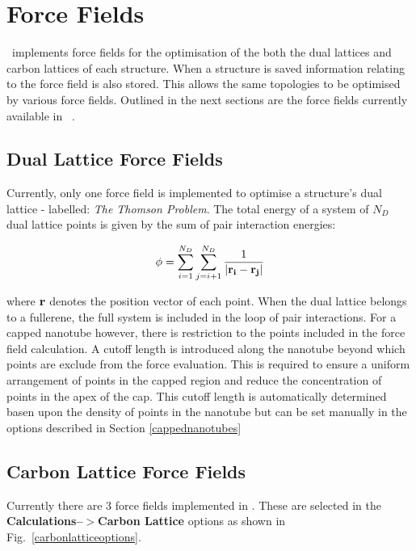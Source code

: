 \section{Force Fields}\label{forcefields}

\nanocap~implements force fields for the optimisation of the both the dual lattices and carbon lattices of each structure. When a structure is saved information relating to the force field is also stored. This allows the same topologies to be optimised by various force fields. Outlined in the next sections are the force fields currently available in \nanocap~.

\subsection{Dual Lattice Force Fields}\label{dforcefields}

Currently, only one force field is implemented to optimise a structure's dual lattice - labelled: \textit{The Thomson Problem}. The total energy of a system of $N_D$ dual lattice points is given by the sum of pair interaction energies:

\begin{equation*}
 \displaystyle \phi = \sum_{i=1}^{N_{D}}\sum_{j=i+1}^{N_{D}}\frac{1}{| \boldsymbol{\mathrm{r_i}}-\boldsymbol{\mathrm{r_j}}| } 
\end{equation*}

where $\boldsymbol{\mathrm{r}}$ denotes the position vector of each point. When the dual lattice belongs to a fullerene, the full system is included in the loop of pair interactions. For a capped nanotube however, there is restriction to the points included in the force field calculation. A cutoff length is introduced along the nanotube beyond which points are exclude from the force evaluation. This is required to ensure a uniform arrangement of points in the capped region and reduce the concentration of points in the apex of the cap. This cutoff length is automatically determined basen upon the density of points in the nanotube but can be set manually in the options described in Section \ref{cappednanotubes}

\subsection{Carbon Lattice Force Fields}

Currently there are 3 force fields implemented in \nanocap. These are selected in the \textbf{Calculations--$>$Carbon Lattice} options as shown in Fig.~\ref{carbonlatticeoptions}.

